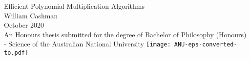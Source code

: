 \begin{titlepage}
\begin{center}

\vspace*{\fill} \Huge
Efficient Polynomial Multiplication Algorithms\\
\vfill\vfill\Large
William Cashman \\
\vfill\vfill
October 2020 \\
\vfill\vfill \normalsize
An Honours thesis submitted for the degree of Bachelor of Philosophy (Honours) - Science of the Australian National University
\vfill
\texttt{[image: ANU-eps-converted-to.pdf]}
\end{center}

\end{titlepage}
